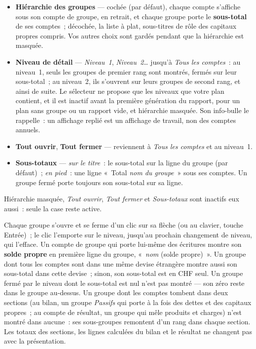 \documentclass[a4paper,11pt,oneside]{article}
\begin{document}
\begin{itemize}
    \item \textbf{Hiérarchie des groupes} --- cochée (par défaut), chaque compte s'affiche sous son
          compte de groupe, en retrait, et chaque groupe porte le \textbf{sous-total} de ses comptes~;
          décochée, la liste à plat, sous-titres de rôle des capitaux propres compris. Vos autres
          choix sont gardés pendant que la hiérarchie est masquée.
    \item \textbf{Niveau de détail} --- \emph{Niveau~1}, \emph{Niveau~2}\ldots{} jusqu'à
          \emph{Tous les comptes}~: au niveau~1, seuls les groupes de premier rang sont montrés,
          fermés sur leur sous-total~; au niveau~2, ils s'ouvrent sur leurs groupes de second rang,
          et ainsi de suite. Le sélecteur ne propose que les niveaux que votre plan contient, et il
          est inactif avant la première génération du rapport, pour un plan sans groupe ou un
          rapport vide, et hiérarchie masquée. Son info-bulle le rappelle~: un
          affichage replié est un affichage de travail, non des comptes annuels.
    \item \textbf{Tout ouvrir}, \textbf{Tout fermer} --- reviennent à \emph{Tous les comptes} et au
          niveau~1.
    \item \textbf{Sous-totaux} --- \emph{sur le titre}~: le sous-total sur la ligne du groupe (par
          défaut)~; \emph{en pied}~: une ligne «~Total \emph{nom du groupe}~» sous ses comptes. Un
          groupe fermé porte toujours son sous-total sur sa ligne.
\end{itemize}

Hiérarchie masquée, \emph{Tout ouvrir}, \emph{Tout fermer} et \emph{Sous-totaux} sont inactifs
eux aussi~: seule la case reste active.

Chaque groupe s'ouvre et se ferme d'un clic sur sa flèche (ou au clavier, touche Entrée)~; le
clic l'emporte sur le niveau, jusqu'au prochain changement de niveau, qui l'efface. Un compte de
groupe qui porte lui-même des écritures montre son \textbf{solde propre} en première ligne du
groupe, «~\emph{nom} (solde propre)~». Un groupe dont tous les comptes sont dans une même devise
étrangère montre aussi son sous-total dans cette devise~; sinon, son sous-total est en CHF seul.
Un groupe fermé par le niveau dont le sous-total est nul n'est pas montré --- son zéro reste
dans le groupe au-dessus. Un groupe dont les comptes tombent dans deux sections (au bilan, un
groupe \emph{Passifs} qui porte à la fois des dettes et des capitaux propres~; au compte de
résultat, un groupe qui mêle produits et charges) n'est montré dans aucune~: ses sous-groupes
remontent d'un rang dans chaque section. Les totaux des sections, les lignes calculées du bilan
et le résultat ne changent pas avec la présentation.
\end{document}
